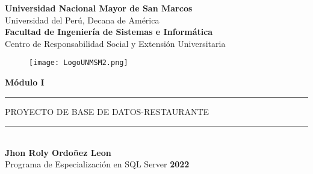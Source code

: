 	\begin{titlepage}
		\begin{center}
			{\LARGE \textbf{Universidad Nacional Mayor de San Marcos}}\\
			\vspace{0.25cm}
			{\LARGE Universidad del Perú, Decana de América}\\
			\vspace{0.25cm}
			{\LARGE \textbf{Facultad de Ingeniería de Sistemas e Informática}}\\
			\vspace{0.5cm}
			{\LARGE Centro de Responsabilidad Social y Extensión Universitaria}\\
			\vspace{0.5cm}
			\begin{figure}[h]
				\centering
				\texttt{[image: LogoUNMSM2.png]}
			\end{figure}
			\vspace{1cm}
			{\LARGE \textbf{Módulo I}}\\
			\vspace{0.5cm}
			\textcolor{charcoal}{\rule{150mm}{0.5mm}}
			\vspace{2mm}
				\begin{spacing}{1.5}
					{\LARGE PROYECTO DE BASE DE DATOS-RESTAURANTE}
				\end{spacing}
			\vspace{2mm}
			\textcolor{charcoal}{\rule{150mm}{0.5mm}}
			\vspace{0.7cm}\\
			{\Large \textbf{Jhon Roly Ordoñez Leon}}\\
			\vspace{5mm}
			{\Large Programa de Especialización en SQL Server}
			\vfill
			{\Huge \textbf{2022}}	
		\end{center}
	\end{titlepage}